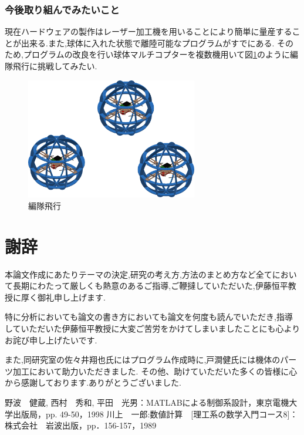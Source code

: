 \documentclass[12pt,oneside]{sotsuken_paper}
\begin{document}
\subsection{今後取り組んでみたいこと}

現在ハードウェアの製作はレーザー加工機を用いることにより簡単に量産することが出来る.また,球体に入れた状態で離陸可能なプログラムがすでにある.
そのため,プログラムの改良を行い球体マルチコプターを複数機用いて図\ref{fig:hen}のように編隊飛行に挑戦してみたい.

\begin{figure}[htbp]
	\begin{center}
		\includegraphics[width=75mm]{image/hen.png}
		\caption{編隊飛行}
		\label{fig:hen}
	\end{center}
\end{figure}


\chapter*{謝辞}
本論文作成にあたりテーマの決定,研究の考え方,方法のまとめ方など全てにおいて長期にわたって厳しくも熱意のあるご指導,ご鞭撻していただいた,伊藤恒平教授に厚く御礼申し上げます.


特に分析においても論文の書き方においても論文を何度も読んでいただき,指導していただいた伊藤恒平教授に大変ご苦労をかけてしまいましたことにも心よりお詫び申し上げたいです.


また,同研究室の佐々井翔也氏にはプログラム作成時に,戸澗健氏には機体のパーツ加工において助力いただきました.
その他、助けていただいた多くの皆様に心から感謝しております.ありがとうございました.

\begin{thebibliography}{8}
	 野波　健蔵, 西村　秀和, 平田　光男：MATLABによる制御系設計，東京電機大学出版局，pp. 49-50，1998
	 川上　一郎:数値計算　[理工系の数学入門コース8]：株式会社　岩波出版，pp．156-157，1989
\end{thebibliography}
\end{document}
